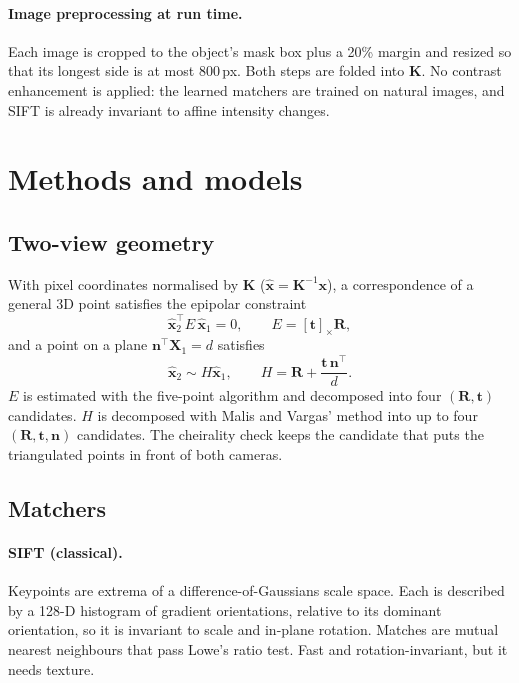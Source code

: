 \documentclass[11pt,a4paper]{article}
\newcommand{\R}{\mathbf{R}}
\newcommand{\tv}{\mathbf{t}}
\newcommand{\K}{\mathbf{K}}
\newcommand{\X}{\mathbf{X}}
\begin{document}
\paragraph{Image preprocessing at run time.} Each image is cropped to the object's mask box plus a 20\%
margin and resized so that its longest side is at most 800\,px. Both steps are folded into $\K$. No contrast
enhancement is applied: the learned matchers are trained on natural images, and SIFT is
already invariant to affine intensity changes.

\section{Methods and models}
\label{sec:models}

\subsection{Two-view geometry}
With pixel coordinates normalised by $\K$ ($\hat{\mathbf{x}} = \K^{-1}\mathbf{x}$), a
correspondence of a general 3D point satisfies the epipolar constraint
\begin{equation}
  \hat{\mathbf{x}}_2^\top E\, \hat{\mathbf{x}}_1 = 0, \qquad E = [\tv]_\times \R ,
\end{equation}
and a point on a plane $\mathbf{n}^\top\X_1 = d$ satisfies
\begin{equation}
  \hat{\mathbf{x}}_2 \sim H \hat{\mathbf{x}}_1, \qquad H = \R + \frac{\tv\,\mathbf{n}^\top}{d}.
\end{equation}
$E$ is estimated with the five-point algorithm \cite{nister} and decomposed into four
$(\R,\tv)$ candidates. $H$ is decomposed with Malis and Vargas' method \cite{malis} into up to four
$(\R,\tv,\mathbf{n})$ candidates. The cheirality check keeps the candidate that puts the
triangulated points in front of both cameras.

\subsection{Matchers}

\paragraph{SIFT \cite{sift} (classical).} Keypoints are extrema of a difference-of-Gaussians
scale space. Each is described by a 128-D histogram of gradient orientations, relative to its
dominant orientation, so it is invariant to scale and in-plane rotation. Matches are mutual
nearest neighbours that pass Lowe's ratio test. Fast and rotation-invariant, but it needs texture.
\end{document}
